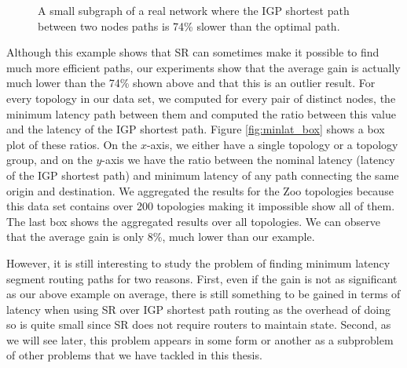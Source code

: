 \begin{figure}
\begin{center}
\end{center}
\caption{A small subgraph of a real network where the IGP shortest path between two nodes paths is 74\% slower than the optimal path.}
\label{fig:minlat_example}
\end{figure}

Although this example shows that SR can sometimes make it possible to find much more efficient paths, our
experiments show that the average gain is actually much lower than the 74\% shown above and that this is
an outlier result. For every topology in our data set,
we computed for every pair of distinct nodes, the minimum latency path between them and computed the ratio
between this value and the latency of the IGP shortest path. Figure \ref{fig:minlat_box} shows a box plot of these ratios.
On the $x$-axis, we either have a single topology or a topology group, and on the $y$-axis we have the ratio between
the nominal latency (latency of the IGP shortest path) and minimum latency of any path connecting the same
origin and destination.
We aggregated the results for the Zoo topologies because this data set contains over
200 topologies making it impossible show all of them. The last box shows the aggregated results over all topologies.
We can observe that the average gain is only 8\%, much lower than our example.

However, it is still interesting to study the problem of finding minimum latency segment routing paths for two reasons.
First, even if the gain is not as significant as our above example on average, there is still something to be gained in terms 
of latency when using SR over IGP shortest path routing as the overhead of doing so is quite small since
SR does not require routers to maintain state.
Second, as we will see later, this problem appears in some form or another as a subproblem of other
problems that we have tackled in this thesis.

